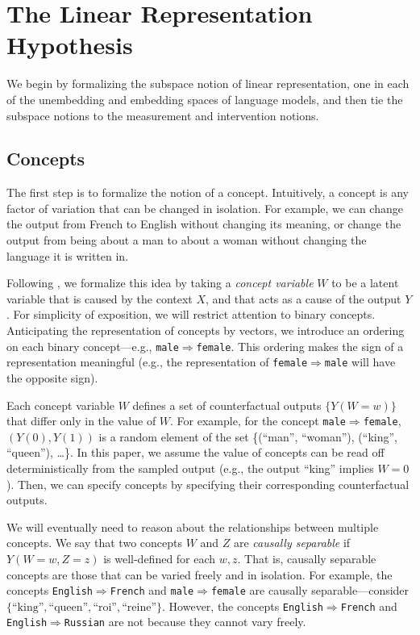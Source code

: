 \documentclass{article}
\theoremstyle{plain}
\theoremstyle{definition}
\theoremstyle{remark}
\newcommand{\ConceptDirName}[2]{\texttt{#1$\Rightarrow$#2}}
\begin{document}
\section{The Linear Representation Hypothesis}\label{sec:linear_rep_hyp}
We begin by formalizing the subspace notion of linear representation, one in each of the unembedding and embedding spaces of language models, and then tie the subspace notions to the measurement and intervention notions.

\subsection{Concepts}
The first step is to formalize the notion of a concept. Intuitively, a concept is any factor of variation that can be changed in isolation. For example, we can change the output from French to English without changing its meaning, or change the output from being about a man to about a woman without changing the language it is written in.

Following \citet{wang2023concept}, we formalize this idea by taking a \emph{concept variable} $W$ to be a latent variable that is caused by the context $X$, and that acts as a cause of the output $Y$.
For simplicity of exposition, we will restrict attention to binary concepts.
Anticipating the representation of concepts by vectors, we introduce an ordering on each binary concept---e.g., \ConceptDirName{male}{female}. This ordering makes the sign of a representation meaningful (e.g., the representation of \ConceptDirName{female}{male} will have the opposite sign).

Each concept variable $W$ defines a set of counterfactual outputs $\{Y(W=w)\}$ that differ only in the value of $W$.
For example, for the concept \ConceptDirName{male}{female}, $(Y(0),Y(1))$ is a random element of the set \{(``man'', ``woman''), (``king'', ``queen''), \dots\}. In this paper, we assume the value of concepts can be read off deterministically from the sampled output (e.g., the output ``king'' implies $W=0$). Then, we can specify concepts by specifying their corresponding counterfactual outputs.

We will eventually need to reason about the relationships between multiple concepts. 
We say that two concepts $W$ and $Z$ are \emph{causally separable} if $Y(W=w,Z=z)$ is well-defined for each $w,z$. That is, causally separable concepts are those that can be varied freely and in isolation.
For example, the concepts \ConceptDirName{English}{French} and \ConceptDirName{male}{female} are causally separable---consider $\{\text{``king''}, \text{``queen''}, \text{``roi''}, \text{``reine''}\}$.
However, the concepts \ConceptDirName{English}{French} and \ConceptDirName{English}{Russian} are not because they cannot vary freely.
\end{document}
